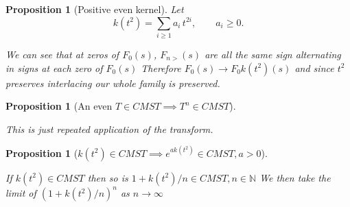 \documentclass[11pt]{article}
\theoremstyle{breakdef}
\newtheorem{proposition}[theorem]{Proposition}
\begin{document}
\begin{proposition}[Positive even kernel]\label{def:k-positive-even}
Let
\begin{equation}
k(t^2)=\sum_{i\ge1} a_i\,t^{2i},\qquad a_i \ge 0.
\end{equation}

We can see that at zeros of $F_0(s)$, $F_{n>}(s)$ are all the same sign alternating in signs at each zero of $F_0(s)$  Therefore $F_0(s) \to F_0 k(t^2) (s)$ and since $t^2$ preserves interlacing our whole family is preserved.

\end{proposition}

\begin{proposition}[An even $T \in CMST \implies T^n \in CMST$]\label{def:k-powers1}

This is just repeated application of the transform.

\end{proposition}

\begin{proposition}[$k(t^2) \in CMST \implies e^{a k(t^2)} \in CMST, a > 0$]\label{def:k-powers2}


If $k(t^2) \in CMST$ then so is $1+k(t^2)/n \in CMST, n \in \mathbb{N}$
We then take the limit of $(1+k(t^2)/n)^n$ as $n \to \infty$

\end{proposition}
\end{document}
